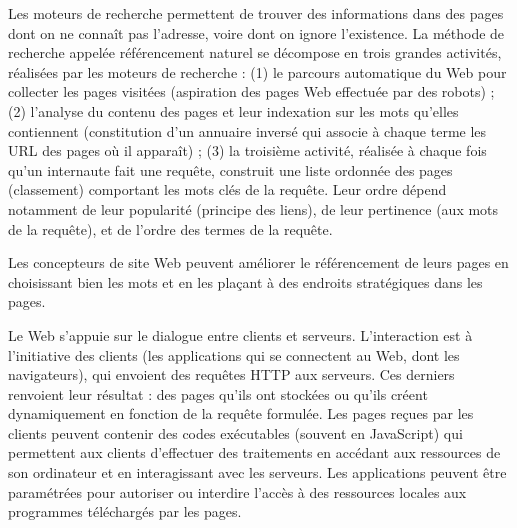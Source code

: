 \begin{tcolorbox}[title={Moteurs de recherche}, toprule=0pt, leftrule=0pt, rightrule=0pt, arc=0pt,
                  fonttitle=\scshape\boxtitlefont,
                  colbacktitle=white, coltitle=firstcolor, colframe=firstcolor, colback=firstcolor!10,
                  breakable, enhanced jigsaw]
 Les moteurs de recherche permettent de trouver des informations dans des pages dont on ne connaît pas l’adresse, voire dont on ignore l’existence. La méthode de recherche appelée référencement naturel se décompose en trois grandes activités, réalisées par les moteurs de recherche : (1) le parcours automatique du Web pour collecter les pages visitées (aspiration des pages Web effectuée par des robots) ; (2) l’analyse du contenu des pages et leur indexation sur les mots qu’elles contiennent (constitution d’un annuaire inversé qui associe à chaque terme les URL des pages où il apparaît) ; (3) la troisième activité, réalisée à chaque fois qu’un internaute fait une requête, construit une liste ordonnée des pages (classement) comportant les mots clés de la requête. Leur ordre dépend notamment de leur popularité (principe des liens), de leur pertinence (aux mots de la requête), et de l’ordre des termes de la requête.

Les concepteurs de site Web peuvent améliorer le référencement de leurs pages en choisissant bien les mots et en les plaçant à des endroits stratégiques dans les pages.
\end{tcolorbox}

\begin{tcolorbox}[title={Interaction client/serveur}, toprule=0pt, leftrule=0pt, rightrule=0pt, arc=0pt,
                  fonttitle=\scshape\boxtitlefont,
                  colbacktitle=white, coltitle=firstcolor, colframe=firstcolor, colback=firstcolor!10,
                  breakable, enhanced jigsaw]
Le Web s’appuie sur le dialogue entre clients et serveurs. L’interaction est à l’initiative des clients (les applications qui se connectent au Web, dont les navigateurs), qui envoient des requêtes HTTP aux serveurs. Ces derniers renvoient leur résultat : des pages qu’ils ont stockées ou qu’ils créent dynamiquement en fonction de la requête formulée. Les pages reçues par les clients peuvent contenir des codes exécutables (souvent en JavaScript) qui permettent aux clients d’effectuer des traitements en accédant aux ressources de son ordinateur et en interagissant avec les serveurs.
Les applications peuvent être paramétrées pour autoriser ou interdire l’accès à des ressources locales aux programmes téléchargés par les pages.
\end{tcolorbox}


